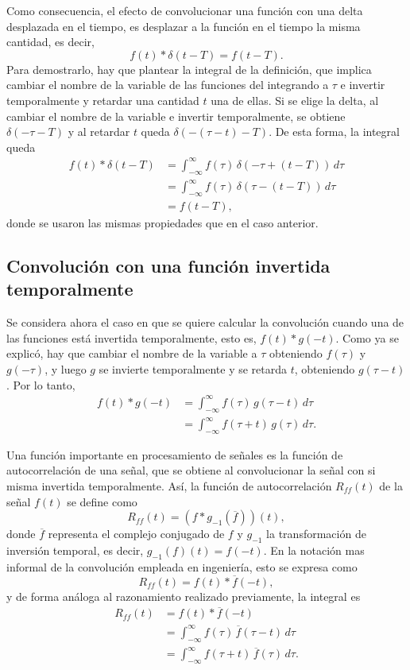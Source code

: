 \documentclass[a4paper]{article}
\begin{document}
Como consecuencia, el efecto de convolucionar una función con una delta desplazada en el tiempo, es desplazar a la función en el tiempo la misma cantidad, es decir,
\[
 f(t)*\delta(t-T)=f(t-T).
\]
Para demostrarlo, hay que plantear la integral de la definición, que implica cambiar el nombre de la variable de las funciones del integrando a \(\tau\) e invertir temporalmente y retardar una cantidad \(t\) una de ellas. Si se elige la delta, al cambiar el nombre de la variable e invertir temporalmente, se obtiene \(\delta(-\tau-T)\) y al retardar \(t\) queda \(\delta(-(\tau-t)-T)\). De esta forma, la integral queda
\begin{align*}
 f(t)*\delta(t-T)&=\int_{-\infty }^{\infty }f(\tau)\,\delta(-\tau+(t-T))\,d\tau \\
        &=\int_{-\infty }^{\infty }f(\tau)\,\delta(\tau-(t-T))\,d\tau \\
        &=f(t-T),
\end{align*}
donde se usaron las mismas propiedades que en el caso anterior.

\subsection{Convolución con una función invertida temporalmente}

Se considera ahora el caso en que se quiere calcular la convolución cuando una de las funciones está invertida temporalmente, esto es, \(f(t)*g(-t)\). Como ya se explicó, hay que cambiar el nombre de la variable a \(\tau\) obteniendo \(f(\tau)\) y \(g(-\tau)\), y luego \(g\) se invierte temporalmente y se retarda \(t\), obteniendo \(g(\tau-t)\). Por lo tanto,
\begin{align*}
 f(t)*g(-t)&=\int_{-\infty }^{\infty }f(\tau)\,g(\tau-t)\,d\tau \\
           &=\int_{-\infty }^{\infty }f(\tau+t)\,g(\tau)\,d\tau.
\end{align*}

Una función importante en procesamiento de señales es la función de autocorrelación de una señal, que se obtiene al convolucionar la señal con si misma invertida temporalmente. Así, la función de autocorrelación \(R_{ff}(t)\) de la señal \(f(t)\) se define como
\[
 R_{ff}(t)=(f*g_{-1}({\overline{f}}))(t),
\]
donde \(\overline{f}\) representa el complejo conjugado de \(f\) y \(g_{-1}\) la transformación de inversión temporal, es decir, \({\displaystyle g_{-1}(f)(t)=f(-t)}\). En la notación mas informal de la convolución empleada en ingeniería, esto se expresa como
\[
 R_{ff}(t)=f(t)*\overline{f}(-t),
\]
y de forma análoga al razonamiento realizado previamente, la integral es
\begin{align*}
 R_{ff}(t)&=f(t)*\overline{f}(-t)\\
          &=\int_{-\infty }^{\infty }f(\tau)\,\overline{f}(\tau-t)\,d\tau \\
          &=\int_{-\infty }^{\infty }f(\tau+t)\,\overline{f}(\tau)\,d\tau.
\end{align*}


% 
\end{document}
